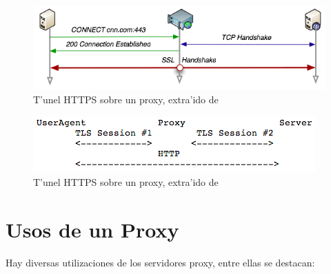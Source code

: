 \begin{figure}[h]
  	\centering
	\includegraphics[width=\textwidth]{img/proxy_2}
	\caption{\small T'unel HTTPS sobre un proxy, extra'ido de \cite{secureProxies}}
	\label{proxy_2}
\end{figure}

\begin{figure}[h]
  	\centering
	\includegraphics[width=\textwidth]{img/trustedProxy}
	\caption{\small T'unel HTTPS sobre un proxy, extra'ido de \cite{draftTrustedProxy}}
	\label{trustedProxy}
\end{figure}

\section{Usos de un Proxy}

Hay diversas utilizaciones de los servidores proxy, entre ellas se destacan:

